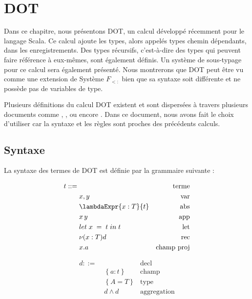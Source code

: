 \chapter{DOT}

Dans ce chapitre, nous présentons DOT, un calcul développé récemment pour le
langage Scala. Ce calcul ajoute les types, alors
appelés types chemin dépendants, dans les enregistrements. Des types
récursifs, c'est-à-dire des types qui peuvent faire référence à eux-mêmes, sont
également définis. Un système de sous-typage pour ce calcul sera
également présenté.
Nous montrerons que DOT peut être vu comme une
extension de Système $F_{<:}$ bien que sa syntaxe soit différente et ne possède
pas de variables de type.

Plusieurs définitions du calcul DOT existent et sont dispersées à travers
plusieurs documents comme \cite{nada-amin-thesis}, \cite{OOPSLA-DOT-2016},
\cite{POPL-2017-DOT} ou encore \cite{WF-DOT-2016}. Dans ce document, nous avons
fait le choix d'utiliser \cite{WF-DOT-2016} car la syntaxe et les règles sont
proches des précédents calculs.

\section{Syntaxe}

La syntaxe des termes de DOT est définie par la grammaire suivante :
\begin{minipage}{0.45\textwidth}
  \begin{align*}
    t ::= & \, & \text{terme} \\
          & \; x, y & \text{var} \\
          & \; \lambdaExpr{x : T}{t} & \text{abs} \\
          & \; x \, y & \text{app} \\
          & \; \localLetBinding{x}{t}{t} & \text{let} \\
          & \; \nu(x : T)d & \text{rec} \\
          & \; x.a & \text{champ proj} \\
\end{align*}
\end{minipage}
\begin{minipage}{0.45\textwidth}
  \begin{align*}
    d ::= & \, & \text{decl} \\
          & \; \left\{ a : t \right\} & \text{champ} \\
          & \; \left\{ A = T \right\} & \text{type} \\
          & \; d \wedge d & \text{aggregation}
\end{align*}
\end{minipage}

